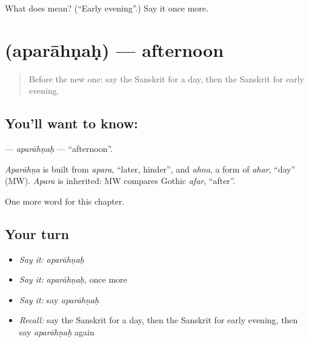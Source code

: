 \begin{tcolorbox}[breakable,colback=teal!4,colframe=teal!35!black,title={Before you move on}]
What does  mean? (\textquotedblleft{}Early evening\textquotedblright{}.) Say it once more.
\end{tcolorbox}
\section[\texorpdfstring{\sk{अपराह्णः} (aparāhṇaḥ)}{अपराह्णः (aparāhṇaḥ)}]{ (aparāhṇaḥ) — afternoon}

\label{lesson:SA-C90-aparahnah}



\begin{quote}
Before the new one: say the Sanskrit for a day, then the Sanskrit for early evening.
\end{quote}

\subsection*{You'll want to know: }
\textbf{} — \emph{aparāhṇaḥ} — \textquotedblleft{}afternoon\textquotedblright{}.

\begin{cousinweb}
\emph{Aparāhṇa} is built from \emph{apara}, \textquotedblleft{}later, hinder\textquotedblright{}, and \emph{ahna}, a form of \emph{ahar}, \textquotedblleft{}day\textquotedblright{} (MW). \emph{Apara} is inherited: MW compares Gothic \emph{afar}, \textquotedblleft{}after\textquotedblright{}.
\end{cousinweb}

\begin{grammarlens}[title={What you've built}]
One more word for this chapter.
\end{grammarlens}

\subsection*{Your turn}
\begin{itemize}
\raggedright
  \item \emph{Say it:} \emph{aparāhṇaḥ}
  \item \emph{Say it:} \emph{aparāhṇaḥ}, once more
  \item \emph{Say it:} say \emph{aparāhṇaḥ}
  \item \emph{Recall:} say the Sanskrit for a day, then the Sanskrit for early evening, then say \emph{aparāhṇaḥ} again
\end{itemize}

